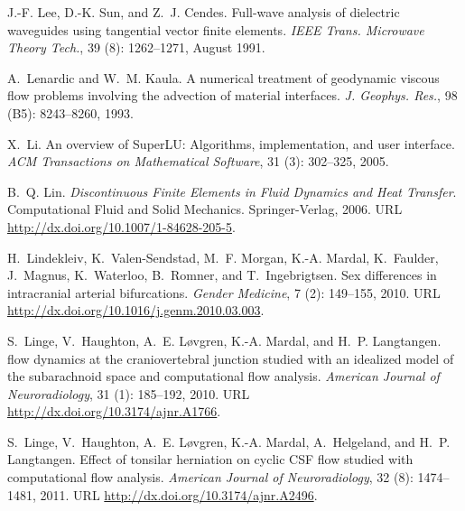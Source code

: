 \begin{thebibliography}{467}
J.-F. Lee, D.-K. Sun, and Z.~J. Cendes.
\newblock Full-wave analysis of dielectric waveguides using tangential vector
  finite elements.
\newblock \emph{IEEE Trans. Microwave Theory Tech.}, 39 (8):
  1262--1271, August 1991.

A.~Lenardic and W.~M. Kaula.
\newblock A numerical treatment of geodynamic viscous flow problems involving
  the advection of material interfaces.
\newblock \emph{J. Geophys. Res.}, 98 (B5): 8243--8260, 1993.

X.~Li.
\newblock An overview of {SuperLU}: {A}lgorithms, implementation, and user
  interface.
\newblock \emph{ACM Transactions on Mathematical Software}, 31
  (3): 302--325, 2005.

B.~Q. Lin.
\newblock \emph{Discontinuous Finite Elements in Fluid Dynamics and Heat
  Transfer}.
\newblock Computational Fluid and Solid Mechanics. Springer-Verlag, 2006.
\newblock URL \url{http://dx.doi.org/10.1007/1-84628-205-5}.

H.~Lindekleiv, K.~Valen-Sendstad, M.~F. Morgan, K.-A. Mardal, K.~Faulder,
  J.~Magnus, K.~Waterloo, B.~Romner, and T.~Ingebrigtsen.
\newblock Sex differences in intracranial arterial bifurcations.
\newblock \emph{Gender Medicine}, 7 (2): 149--155, 2010.
\newblock URL \url{http://dx.doi.org/10.1016/j.genm.2010.03.003}.

S.~Linge, V.~Haughton, A.~E. L{\o}vgren, K.-A. Mardal, and H.~P. Langtangen.
 flow dynamics at the craniovertebral junction studied with an
  idealized model of the subarachnoid space and computational flow analysis.
\newblock \emph{American Journal of Neuroradiology}, 31 (1):
  185--192, 2010.
\newblock URL \url{http://dx.doi.org/10.3174/ajnr.A1766}.

S.~Linge, V.~Haughton, A.~E. L{\o}vgren, K.-A. Mardal, A.~Helgeland, and H.~P.
  Langtangen.
\newblock Effect of tonsilar herniation on cyclic {CSF} flow studied with
  computational flow analysis.
\newblock \emph{American Journal of Neuroradiology}, 32 (8): 1474--1481, 2011.
\newblock URL \url{http://dx.doi.org/10.3174/ajnr.A2496}.


\end{thebibliography}
